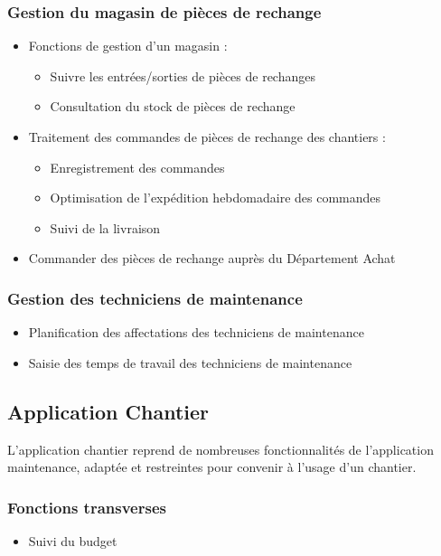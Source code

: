 \documentclass[twoside]{article}
\begin{document}
\subsubsection{Gestion du magasin de pièces de rechange}
\begin{itemize}
\item Fonctions de gestion d'un magasin :
    \begin{itemize}
    \item Suivre les entrées/sorties de pièces de rechanges
    \item Consultation du stock de pièces de rechange
    \end{itemize}
\item Traitement des commandes de pièces de rechange des chantiers :
    \begin{itemize}
    \item Enregistrement des commandes
    \item Optimisation de l'expédition hebdomadaire des commandes
    \item Suivi de la livraison 
    \end{itemize}
\item Commander des pièces de rechange auprès du Département Achat
\end{itemize}

\subsubsection{Gestion des techniciens de maintenance}
\begin{itemize}
\item Planification des affectations des techniciens de maintenance
\item Saisie des temps de travail des techniciens de maintenance
\end{itemize}


\subsection{Application Chantier}
L'application chantier reprend de nombreuses fonctionnalités de
l'application maintenance, adaptée et restreintes pour convenir à l'usage
d'un chantier.

\subsubsection{Fonctions transverses}
\begin{itemize}
\item Suivi du budget
\end{itemize}
\end{document}
